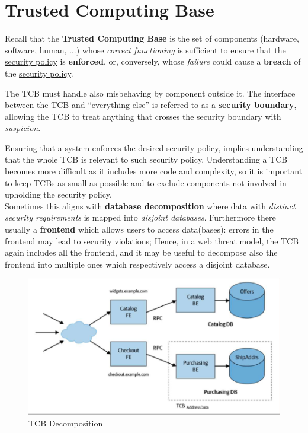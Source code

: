 \section{Trusted Computing Base}
Recall that the \textbf{Trusted Computing Base} is the set of components (hardware, software, human, ...) whose \textit{correct functioning} is sufficient to ensure that the \underline{security policy}
is \textbf{enforced}, or, conversely,
whose \textit{failure} could cause a \textbf{breach} of the \underline{security policy}.

The TCB must handle also misbehaving by component outside it.
The interface between the TCB and “everything else” is referred to as a
\textbf{security boundary},
allowing the TCB to treat anything that crosses the security boundary with
\textit{suspicion}.

Ensuring that a system enforces the desired security policy, implies
understanding that the whole TCB is relevant to such security policy.
Understanding a TCB becomes more difficult as it includes more code
and complexity, 
so it is important to keep TCBs as small as possible and
to exclude components not involved in upholding the security policy.\\
Sometimes this aligns with \textbf{database decomposition} where data with \textit{distinct security requirements} is mapped into \textit{disjoint databases}.
Furthermore there usually a \textbf{frontend} which allows users to access data(bases):
errors in the frontend may lead to security violations;
Hence, in a web threat model, the TCB again includes all the
frontend,
and it may be useful to decompose also the frontend into multiple ones which respectively access a disjoint database.

\begin{figure}[htbp]
   \centering
   \includegraphics{images/tcb_decomposition.png}
   \caption{TCB Decomposition}
   \label{fig:tcb_decomposition}
\end{figure}


